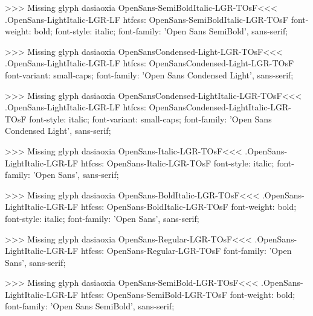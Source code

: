 >>>
Missing glyph	dasiaoxia
\<OpenSans-SemiBoldItalic-LGR-TOsF\><<<
.OpenSans-LightItalic-LGR-LF
htfcss:  OpenSans-SemiBoldItalic-LGR-TOsF  font-weight: bold; font-style: italic; font-family: 'Open Sans SemiBold', sans-serif;

>>>
Missing glyph	dasiaoxia
\<OpenSansCondensed-Light-LGR-TOsF\><<<
.OpenSans-LightItalic-LGR-LF
htfcss:  OpenSansCondensed-Light-LGR-TOsF  font-variant: small-caps; font-family: 'Open Sans Condensed Light', sans-serif;

>>>
Missing glyph	dasiaoxia
\<OpenSansCondensed-LightItalic-LGR-TOsF\><<<
.OpenSans-LightItalic-LGR-LF
htfcss:  OpenSansCondensed-LightItalic-LGR-TOsF  font-style: italic; font-variant: small-caps; font-family: 'Open Sans Condensed Light', sans-serif;

>>>
Missing glyph	dasiaoxia
\<OpenSans-Italic-LGR-TOsF\><<<
.OpenSans-LightItalic-LGR-LF
htfcss:  OpenSans-Italic-LGR-TOsF  font-style: italic; font-family: 'Open Sans', sans-serif;

>>>
Missing glyph	dasiaoxia
\<OpenSans-BoldItalic-LGR-TOsF\><<<
.OpenSans-LightItalic-LGR-LF
htfcss:  OpenSans-BoldItalic-LGR-TOsF  font-weight: bold; font-style: italic; font-family: 'Open Sans', sans-serif;

>>>
Missing glyph	dasiaoxia
\<OpenSans-Regular-LGR-TOsF\><<<
.OpenSans-LightItalic-LGR-LF
htfcss:  OpenSans-Regular-LGR-TOsF  font-family: 'Open Sans', sans-serif;

>>>
Missing glyph	dasiaoxia
\<OpenSans-SemiBold-LGR-TOsF\><<<
.OpenSans-LightItalic-LGR-LF
htfcss:  OpenSans-SemiBold-LGR-TOsF  font-weight: bold; font-family: 'Open Sans SemiBold', sans-serif;

